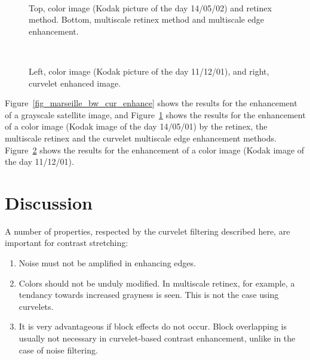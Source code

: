 \begin{figure}[htb]
\centerline{  
\vbox{
\hbox{
}
\hbox{
}}
}
\caption{Top, color image (Kodak picture of the day 14/05/02) and retinex
method. Bottom, multiscale retinex method and multiscale edge enhancement.}
\label{fig_kodak_col_wt_enhance}
\end{figure}

\begin{figure}[htb]
\centerline{  
\vbox{
\hbox{
}
\hbox{
}}
}
\caption{Left, color image (Kodak picture of the day 11/12/01), and right,
curvelet enhanced image.}
\label{fig_kodak2_col_cur_enhance}
\end{figure}

Figure~\ref{fig_marseille_bw_cur_enhance}  
shows the results for the enhancement of a grayscale satellite image, and
Figure~\ref{fig_kodak_col_wt_enhance}  
shows the results for the enhancement of a color image (Kodak image of
the day 14/05/01) by the retinex,
the multiscale retinex and the curvelet multiscale edge enhancement methods.
 Figure~\ref{fig_kodak2_col_cur_enhance} 
shows the results for the enhancement of a color image (Kodak image of
the day 11/12/01).

\section{Discussion}
A number of properties, respected by the curvelet filtering 
described here, are important for contrast stretching:
\begin{enumerate}
\item Noise must not be amplified in enhancing edges.
\item Colors should not be unduly modified.  In multiscale retinex,
for example, a tendancy towards increased grayness is seen.  This is 
not the case using curvelets.
\item It is very advantageous if block effects do not occur. 
Block overlapping is usually not necessary in curvelet-based contrast
enhancement, unlike in the case of noise filtering.  
\end{enumerate}




